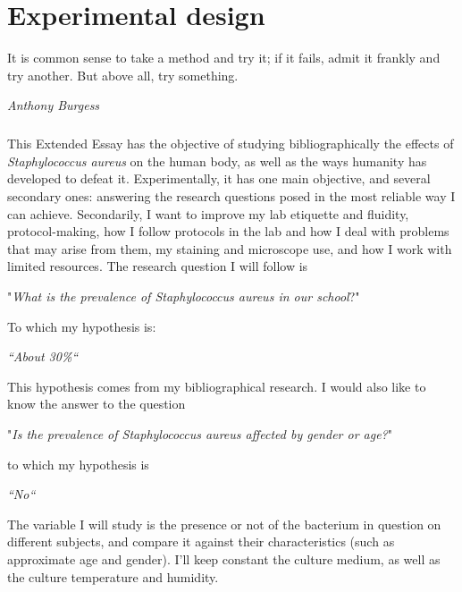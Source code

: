 \chapter{Experimental design}
\epigraph{It is common sense to take a method and try it; if it fails, admit it frankly and try another. But above all, try something.}{\textit{Anthony Burgess}}
\paragraph{}This Extended Essay has the objective of studying bibliographically the effects of \emph{Staphylococcus aureus} on the human body, as well as the ways humanity has developed to defeat it. Experimentally, it has one main objective, and several secondary ones: answering the research questions posed in the most reliable way I can achieve. Secondarily, I want to improve my lab etiquette and fluidity, protocol-making, how I follow protocols in the lab and how I deal with problems that may arise from them, my staining and microscope use,  and how I work with limited resources.\newline 
The research question I will follow is 
\begin{center}"\emph{What is the prevalence of \emph{Staphylococcus aureus} in our school}?"\end{center}
To which my hypothesis is:
\begin{center}\emph{``About 30\%``}\end{center} 
This hypothesis comes from my bibliographical research. I would also like to know the answer to the question
\begin{center}"\emph{Is the prevalence of \emph{Staphylococcus aureus} affected by gender or age?}"\end{center}
to which my hypothesis is 
\begin{center}\emph{``No``}\end{center}
The variable I will study is the presence or not of the bacterium in question on different subjects, and compare it against their characteristics (such as approximate age and gender). I'll keep constant the culture medium, as well as the culture temperature and humidity.
